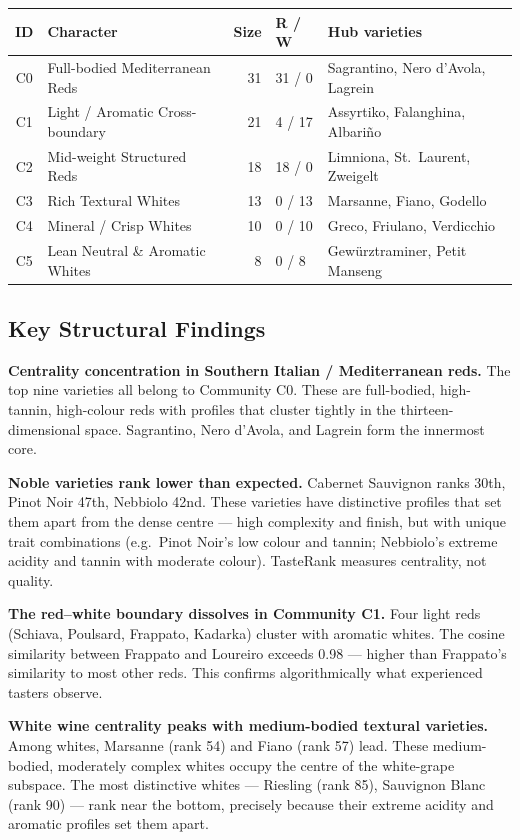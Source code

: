 \documentclass[11pt]{article}
\begin{document}
\begin{center}
\begin{tabular}{@{}clrll@{}}
\toprule
ID & Character & Size & R / W & Hub varieties \\
\midrule
C0 & Full-bodied Mediterranean Reds        & 31 & 31 / 0 & Sagrantino, Nero d'Avola, Lagrein \\
C1 & Light / Aromatic Cross-boundary       & 21 & 4 / 17 & Assyrtiko, Falanghina, Albari\~no \\
C2 & Mid-weight Structured Reds            & 18 & 18 / 0 & Limniona, St.\ Laurent, Zweigelt \\
C3 & Rich Textural Whites                  & 13 & 0 / 13 & Marsanne, Fiano, Godello \\
C4 & Mineral / Crisp Whites                & 10 & 0 / 10 & Greco, Friulano, Verdicchio \\
C5 & Lean Neutral \& Aromatic Whites       &  8 & 0 / 8  & Gew\"urztraminer, Petit Manseng \\
\bottomrule
\end{tabular}
\end{center}

\subsection{Key Structural Findings}
\textbf{Centrality concentration in Southern Italian / Mediterranean reds.} The top nine varieties all belong to Community C0. These are full-bodied, high-tannin, high-colour reds with profiles that cluster tightly in the thirteen-dimensional space. Sagrantino, Nero d'Avola, and Lagrein form the innermost core.

\textbf{Noble varieties rank lower than expected.} Cabernet Sauvignon ranks 30th, Pinot Noir 47th, Nebbiolo 42nd. These varieties have distinctive profiles that set them apart from the dense centre --- high complexity and finish, but with unique trait combinations (e.g.\ Pinot Noir's low colour and tannin; Nebbiolo's extreme acidity and tannin with moderate colour). TasteRank measures centrality, not quality.

\textbf{The red--white boundary dissolves in Community C1.} Four light reds (Schiava, Poulsard, Frappato, Kadarka) cluster with aromatic whites. The cosine similarity between Frappato and Loureiro exceeds 0.98 --- higher than Frappato's similarity to most other reds. This confirms algorithmically what experienced tasters observe.

\textbf{White wine centrality peaks with medium-bodied textural varieties.} Among whites, Marsanne (rank 54) and Fiano (rank 57) lead. These medium-bodied, moderately complex whites occupy the centre of the white-grape subspace. The most distinctive whites --- Riesling (rank 85), Sauvignon Blanc (rank 90) --- rank near the bottom, precisely because their extreme acidity and aromatic profiles set them apart.
\end{document}
